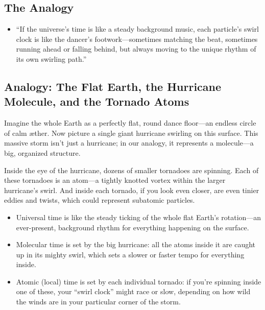\subsection*{The Analogy}

\begin{itemize}

\item
“If the universe’s time is like a steady background music, each particle’s swirl clock is like the dancer’s footwork—sometimes matching the beat, sometimes running ahead or falling behind, but always moving to the unique rhythm of its own swirling path.”




\end{itemize}

\subsection*{Analogy: The Flat Earth, the Hurricane Molecule, and the Tornado Atoms}

Imagine the whole Earth as a perfectly flat, round dance floor—an endless circle of calm æther. Now picture a single giant hurricane swirling on this surface. This massive storm isn’t just a hurricane; in our analogy, it represents a molecule—a big, organized structure.


Inside the eye of the hurricane, dozens of smaller tornadoes are spinning. Each of these tornadoes is an atom—a tightly knotted vortex within the larger hurricane’s swirl. And inside each tornado, if you look even closer, are even tinier eddies and twists, which could represent subatomic particles.


\begin{itemize}

\item
Universal time is like the steady ticking of the whole flat Earth’s rotation—an ever-present, background rhythm for everything happening on the surface.




\item
Molecular time is set by the big hurricane: all the atoms inside it are caught up in its mighty swirl, which sets a slower or faster tempo for everything inside.




\item
Atomic (local) time is set by each individual tornado: if you’re spinning inside one of these, your “swirl clock” might race or slow, depending on how wild the winds are in your particular corner of the storm.




\end{itemize}

